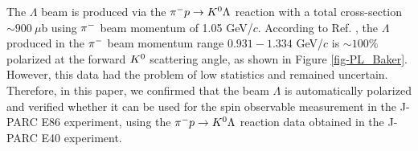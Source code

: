 The $\Lambda$ beam is produced via the $\pi^- p \to K^0 \Lambda$ reaction with a total cross-section $\sim900\ \mu$b \cite{Baker} using $\pi^{-}$ beam momentum of 1.05 GeV/$c$. According to Ref. \cite{Baker}, the $\Lambda$ produced in the $\pi^{-}$ beam momentum range $0.931-1.334$ GeV/$c$ is $\sim100\%$ polarized at the forward $K^{0}$ scattering angle, as shown in Figure \ref{fig-PL_Baker}. However, this data had the problem of low statistics and remained uncertain. Therefore, in this paper, we confirmed that the beam $\Lambda$ is automatically polarized and verified whether it can be used for the spin observable measurement in the J-PARC E86 experiment, using the $\pi^- p \to K^0 \Lambda$ reaction data obtained in the J-PARC E40 experiment.

\begin{comment}

Figure \ref{fig-E86setup} shows the experimental setup of J-PARC E86 \cite{Miwa-LpProp}. To reconstruct $\Kz$, $\pP$ and $\pM$ from the $\kzdecay$ decay will be detected by the forward magnetic spectrometer (SKS) \cite{K1.8} and the CATCH system, respectively. The momentum resolution of SKS is $\Delta p/p = 10^{-3}$ (FWHM), which is 10 times better than KURAMA, which should improve the missing mass resolution. As a result, the S/N ratio of $\Lambda$ identification is expected to be improved.


\end{comment}
